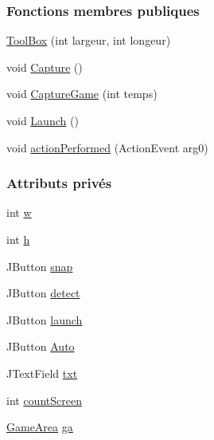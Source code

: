 \subsubsection*{Fonctions membres publiques}
\begin{DoxyCompactItemize}
\item 
\hyperlink{classSuchi_1_1ToolBox_a66f7f53a5ec9a2def49bfd2a52ecab57}{Tool\+Box} (int largeur, int longeur)
\item 
void \hyperlink{classSuchi_1_1ToolBox_a33e258a6449b9052e5ce98367bd80941}{Capture} ()
\item 
void \hyperlink{classSuchi_1_1ToolBox_afd8743df8fce6a9274c564136d829a31}{Capture\+Game} (int temps)
\item 
void \hyperlink{classSuchi_1_1ToolBox_a77cc39fef4071bddda645ca3d855c270}{Launch} ()
\item 
void \hyperlink{classSuchi_1_1ToolBox_aefe6d563c880221c7de743181d3eecc4}{action\+Performed} (Action\+Event arg0)
\end{DoxyCompactItemize}
\subsubsection*{Attributs privés}
\begin{DoxyCompactItemize}
\item 
int \hyperlink{classSuchi_1_1ToolBox_a8fc292a04350a271a813ce27967a1671}{w}
\item 
int \hyperlink{classSuchi_1_1ToolBox_a6032b4cece3e70fd5efd9c095ad390b0}{h}
\item 
J\+Button \hyperlink{classSuchi_1_1ToolBox_a9119a1e4848d392fae658022d9adb98f}{snap}
\item 
J\+Button \hyperlink{classSuchi_1_1ToolBox_aae23d9fd4a361003b33a713b77d496df}{detect}
\item 
J\+Button \hyperlink{classSuchi_1_1ToolBox_a63df00fa65553535385dc418ae03446d}{launch}
\item 
J\+Button \hyperlink{classSuchi_1_1ToolBox_a7f604ce449afde6a9e75b90f28bf5672}{Auto}
\item 
J\+Text\+Field \hyperlink{classSuchi_1_1ToolBox_a16b8d8a2117c1d472884f6246bc255bb}{txt}
\item 
int \hyperlink{classSuchi_1_1ToolBox_afac7389835ffdd62fabec8bc684c5468}{count\+Screen}
\item 
\hyperlink{classSuchi_1_1GameArea}{Game\+Area} \hyperlink{classSuchi_1_1ToolBox_a9bc572881bcc197894300f98b88aefd6}{ga}
\end{DoxyCompactItemize}


